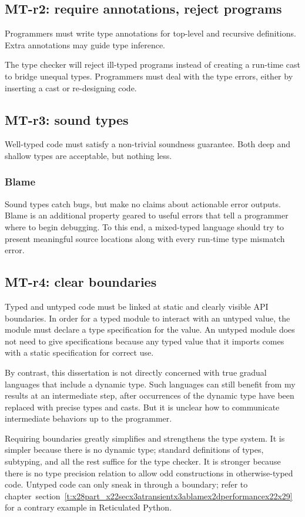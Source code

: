 \documentclass[ twoside,open=right,titlepage,numbers=noenddot,headinclude,%
                footinclude=true,cleardoublepage=empty,abstract=off,
                BCOR=5mm,paper=a4,fontsize=11pt,%
                ngerman,american,%
                parts,pdfspacing]{scrreprt}
\newcommand{\SecRef}[2]{section~#1}
\newcommand{\SecRefLocal}[3]{\hyperref[#1]{\SecRef{#2}{#3}}}
\newcommand{\Ssubsubsection}[2]{\subsubsection[#1]{#2}}
\newcommand{\Ssubsubsubsectionstar}[1]{{\bf #1}}
\newcommand{\Ssubsubsubsectionstarx}[2]{\Ssubsubsubsectionstar{#2}}
\renewcommand{\Ssubsubsection}[2]{\subsection[#1]{#2}}
\renewcommand{\Ssubsubsubsectionstar}[1]{\subsubsection*{#1}}
\renewcommand{\Ssubsubsubsectionstarx}[2]{\Ssubsubsubsectionstar{#2}\addcontentsline{toc}{subsubsection}{#1}}
\renewcommand{\SecRefLocal}[3]{section~\ref{#1}}
\begin{document}
\Ssubsubsection{MT{-}r2: require annotations, reject programs}{MT{-}r2: require annotations, reject programs}\label{t:x28part_x22whyx3amtx2dr2x22x29}

Programmers must write type annotations for top{-}level and recursive
 definitions.
Extra annotations may guide type inference.

The type checker will reject ill{-}typed programs instead of creating a
 run{-}time cast to bridge unequal types.
Programmers must deal with the type errors, either by inserting a cast
 or re{-}designing code.

\Ssubsubsection{MT{-}r3: sound types}{MT{-}r3: sound types}\label{t:x28part_x22whyx3amtx2dr3x22x29}

Well{-}typed code must satisfy a non{-}trivial soundness guarantee.
Both deep and shallow types are acceptable, but nothing less.

\Ssubsubsubsectionstarx{Blame}{Blame}\label{t:x28part_x22Blamex22x29}

Sound types catch bugs, but make no claims about actionable error outputs.
Blame is an additional property geared to useful errors
 that tell a programmer where to begin debugging.
To this end, a mixed{-}typed language should try to present meaningful source
 locations along with every run{-}time type mismatch error.

\Ssubsubsection{MT{-}r4: clear boundaries}{MT{-}r4: clear boundaries}\label{t:x28part_x22whyx3amtx2dr4x22x29}

Typed and untyped code must be linked at static and clearly visible API boundaries.
In order for a typed module to interact with an untyped value, the module
 must declare a type specification for the value.
An untyped module does not need to give specifications because any
 typed value that it imports comes with a static specification for correct use.

By contrast, this dissertation is not directly concerned with true gradual
 languages that include a dynamic type.
Such languages can still benefit from my results at an intermediate step,
 after occurrences of the dynamic type have been replaced with precise types
 and casts.
But it is unclear how to communicate intermediate behaviors up to the
 programmer.

Requiring boundaries greatly simplifies and strengthens the type system.
It is simpler because there is no dynamic type; standard definitions of
 types, subtyping, and all the rest suffice for the type checker.
It is stronger because there is no type precision relation to allow
 odd constructions in otherwise{-}typed code.
Untyped code can only sneak in through a boundary;
 refer to chapter~\SecRefLocal{t:x28part_x22secx3atransientx3ablamex2dperformancex22x29}{5.4.4}{Blame Performance} for a contrary
 example in Reticulated Python.
\end{document}
